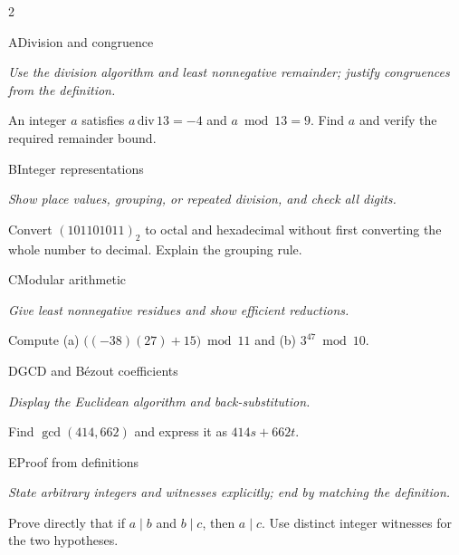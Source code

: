 \documentclass[9pt]{extarticle}
\begin{document}
\begin{multicols}{2}
\begin{CoreProblem}{A}{Division and congruence}
{\scriptsize\textit{Use the division algorithm and least nonnegative remainder; justify congruences from the definition.}\par}
An integer $a$ satisfies $a\,\mathrm{div}\,13=-4$ and $a\bmod13=9$.
Find $a$ and verify the required remainder bound.
\end{CoreProblem}
\begin{CoreProblem}{B}{Integer representations}
{\scriptsize\textit{Show place values, grouping, or repeated division, and check all digits.}\par}
Convert $(101101011)_2$ to octal and hexadecimal without first converting the
whole number to decimal. Explain the grouping rule.
\end{CoreProblem}
\begin{CoreProblem}{C}{Modular arithmetic}
{\scriptsize\textit{Give least nonnegative residues and show efficient reductions.}\par}
Compute (a) $\bigl((-38)(27)+15\bigr)\bmod11$ and
(b) $3^{47}\bmod10$.
\end{CoreProblem}
\columnbreak
\begin{CoreProblem}{D}{GCD and B\'ezout coefficients}
{\scriptsize\textit{Display the Euclidean algorithm and back-substitution.}\par}
Find $\gcd(414,662)$ and express it as $414s+662t$.
\end{CoreProblem}
\begin{CoreProblem}{E}{Proof from definitions}
{\scriptsize\textit{State arbitrary integers and witnesses explicitly; end by matching the definition.}\par}
Prove directly that if $a\mid b$ and $b\mid c$, then $a\mid c$. Use distinct
integer witnesses for the two hypotheses.
\end{CoreProblem}
\end{multicols}
\CoreWorkArea
\FormBreak
{}
\end{document}
